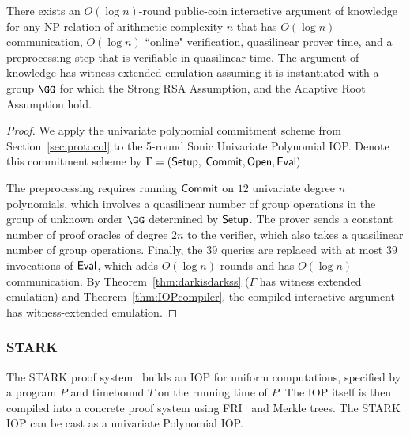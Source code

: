 \begin{theorem}\label{thm:supersonic} 
There exists an $O(\log n)$-round public-coin interactive argument of knowledge for any NP relation of arithmetic complexity $n$ that has $O(\log n)$ communication, $O(\log n)$ ``online" verification, quasilinear prover time, and a preprocessing step that is verifiable in quasilinear time. The argument of knowledge has witness-extended emulation assuming it is instantiated with a group $\GG$ for which the Strong RSA Assumption, and the Adaptive Root Assumption hold. 
\end{theorem}
\begin{proof}
We apply the univariate polynomial commitment scheme from Section~\ref{sec:protocol} to the 5-round Sonic Univariate Polynomial IOP. Denote this commitment scheme by $\Gamma = (\textsf{{Setup}},$ $\textsf{{Commit}}, \textsf{{Open}}, \textsf{{Eval}})$ 

The preprocessing requires running $\textsf{{Commit}}$ on $12$ univariate degree $n$ polynomials, which involves a quasilinear number of group operations in the group of unknown order $\GG$ determined by $\textsf{{Setup}}$. The prover sends a constant number of proof oracles of degree $2n$ to the verifier, which also takes a quasilinear number of group operations. Finally, the 39 queries are replaced with at most $39$ invocations of $\textsf{{Eval}}$, which adds $O(\log n )$ rounds and has $O(\log n)$ communication. By Theorem~\ref{thm:darkisdarkss} ($\Gamma$ has witness extended emulation) and Theorem~\ref{thm:IOPcompiler}, the compiled interactive argument has witness-extended emulation.
\end{proof}

\subsubsection{STARK}
The \textsf{STARK} proof system~\cite{C:BBHR19} builds an IOP for uniform computations, specified by a program $P$ and timebound $T$ on the running time of $P$. %
The IOP itself is then compiled into a concrete proof system using FRI~\cite{ICALP:BBHR18} and Merkle trees.
The \textsf{STARK} IOP can be cast as a univariate Polynomial IOP. 

